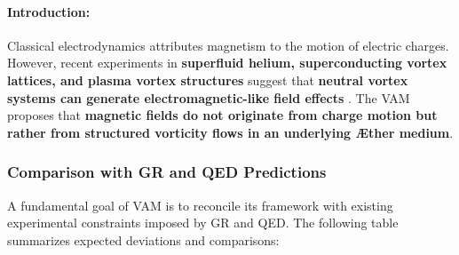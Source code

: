 \documentclass[a4paper,10pt]{article}
\begin{document}
    \begin{abstract}
This section explores the hypothesis that magnetism arises from structured vorticity in an inviscid, incompressible superfluid medium—the Æther. The \textbf{Vortex Æther Model (VAM)} proposes that stable vortex filaments and knots generate field effects traditionally associated with electromagnetism. By deriving fundamental vorticity-based equations, we establish a physical basis for magnetism without requiring moving charge. Using key VAM constants—\( \mathbf{v}_{\scriptscriptstyle\boldsymbol{\circlearrowleft}} \) (core tangential velocity), \( r_c \) (vortex-core radius), and \( F_{\max} \) (maximum force constraint)—we provide a framework where \textbf{magnetic phenomena emerge as a consequence of structured vorticity flows}.
    We also outline experimental tests in superfluid helium, superconductors, and plasma physics to validate the predictions of VAM.
    \end{abstract}

    \paragraph*{Introduction:}

Classical electrodynamics attributes magnetism to the motion of electric charges. However, recent experiments in \textbf{superfluid helium, superconducting vortex lattices, and plasma vortex structures} suggest that \textbf{neutral vortex systems can generate electromagnetic-like field effects} \cite{superfluid_he_interferometers}. The VAM proposes that \textbf{magnetic fields do not originate from charge motion but rather from structured vorticity flows in an underlying Æther medium}.

\subsubsection*{Comparison with GR and QED Predictions}
A fundamental goal of VAM is to reconcile its framework with existing experimental constraints imposed by GR and QED. The following table summarizes expected deviations and comparisons:
\end{document}
